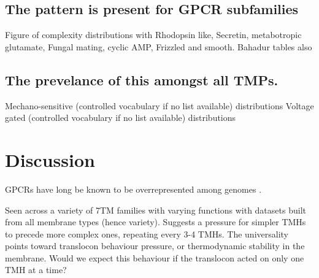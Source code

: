 \subsection{The pattern is present for GPCR subfamilies}
Figure of complexity distributions with Rhodopsin like, Secretin, metabotropic glutamate, Fungal mating, cyclic AMP, Frizzled and smooth.
Bahadur tables also

\subsection{The prevelance of this amongst all TMPs.}
Mechano-sensitive (controlled vocabulary if no list available) distributions
Voltage gated (controlled vocabulary if no list available) distributions

\section{Discussion}
GPCRs have long be known to be overrepresented among genomes \cite{Remm2000}.

Seen across a variety of 7TM families with varying functions with datasets built from all membrane types (hence variety).
Suggests a pressure for simpler TMHs to precede more complex ones, repeating every 3-4 TMHs.
The universality points toward translocon behaviour pressure, or thermodynamic stability in the membrane.
Would we expect this behaviour if the translocon acted on only one TMH at a time?

